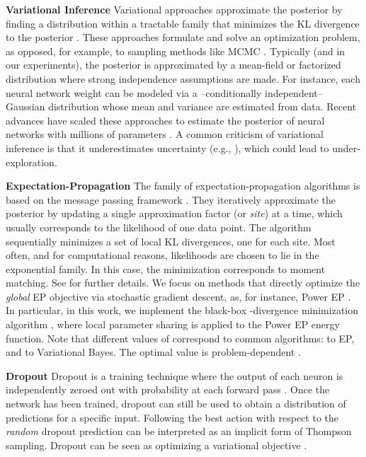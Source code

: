 \documentclass{article} \usepackage{iclr2018_conference,times}
\begin{document}
\textbf{Variational Inference}
Variational approaches approximate the posterior by finding a distribution within a tractable family that minimizes the KL divergence to the posterior \citep{hinton1993keeping}.
These approaches formulate and solve an optimization problem, as opposed, for example, to sampling methods like MCMC \citep{jordan1999introduction, wainwright2008graphical}.
Typically (and in our experiments), the posterior is approximated by a mean-field or factorized distribution where strong independence assumptions are made.
For instance, each neural network weight can be modeled via a --conditionally independent-- Gaussian distribution whose mean and variance are estimated from data.
Recent advances have scaled these approaches to estimate the posterior of neural networks with millions of parameters \citep{blundell2015weight}.
A common criticism of variational inference is that it underestimates uncertainty (e.g., \citep{bishop2006pattern}), which could lead to under-exploration.

\textbf{Expectation-Propagation} The family of expectation-propagation algorithms \citep{opper2000gaussian, minka2001family, minka2001expectation} is based on the message passing framework \citep{pearl1986fusion}. They iteratively approximate the posterior by updating a single approximation factor (or \emph{site}) at a time, which usually corresponds to the likelihood of one data point.
The algorithm sequentially minimizes a set of local KL divergences, one for each site.
Most often, and for computational reasons, likelihoods are chosen to lie in the exponential family.
In this case, the minimization corresponds to moment matching.
See \cite{gelman2014expectation} for further details.
We focus on methods that directly optimize the \emph{global} EP objective via stochastic gradient descent, as, for instance, Power EP \citep{minka2004power}.
In particular, in this work, we implement the black-box -divergence minimization algorithm \citep{Hernandez-Lobato2016}, where local parameter sharing is applied to the Power EP energy function.
Note that different values of  correspond to common algorithms:  to EP, and  to Variational Bayes.
The optimal  value is problem-dependent \citep{Hernandez-Lobato2016}.

\textbf{Dropout} Dropout is a training technique where the output of each neuron is independently zeroed out with probability  at each forward pass \citep{srivastava2014dropout}.
Once the network has been trained, dropout can still be used to obtain a distribution of predictions for a specific input.
Following the best action with respect to the \emph{random} dropout prediction can be interpreted as an implicit form of Thompson sampling.
Dropout can be seen as optimizing a variational objective \citep{kingma2015variational, gal2016dropout, hron2017variational}.
\end{document}

